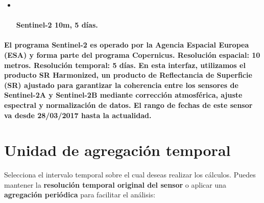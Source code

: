 \documentclass[
]{book}
\begin{document}
\begin{itemize}
\item ~
  \subsubsection{\texorpdfstring{\textbf{Sentinel-2 10m, 5 días}.}{Sentinel-2 10m, 5 días.}}\label{sentinel-2-10m-5-duxedas.}
\end{itemize}

\subsubsection{\texorpdfstring{El programa \textbf{Sentinel-2} es operado por la Agencia Espacial Europea (ESA) y forma parte del programa Copernicus. \textbf{Resolución espacial:} 10 metros. \textbf{Resolución temporal:} 5 días. En esta interfaz, utilizamos el producto SR Harmonized, un producto de Reflectancia de Superficie (SR) ajustado para garantizar la coherencia entre los sensores de Sentinel-2A y Sentinel-2B mediante corrección atmosférica, ajuste espectral y normalización de datos. El \textbf{rango de fechas} de este sensor va desde \textbf{28/03/2017 hasta la actualidad.}}{El programa Sentinel-2 es operado por la Agencia Espacial Europea (ESA) y forma parte del programa Copernicus. Resolución espacial: 10 metros. Resolución temporal: 5 días. En esta interfaz, utilizamos el producto SR Harmonized, un producto de Reflectancia de Superficie (SR) ajustado para garantizar la coherencia entre los sensores de Sentinel-2A y Sentinel-2B mediante corrección atmosférica, ajuste espectral y normalización de datos. El rango de fechas de este sensor va desde 28/03/2017 hasta la actualidad.}}\label{el-programa-sentinel-2-es-operado-por-la-agencia-espacial-europea-esa-y-forma-parte-del-programa-copernicus.-resoluciuxf3n-espacial-10-metros.-resoluciuxf3n-temporal-5-duxedas.-en-esta-interfaz-utilizamos-el-producto-sr-harmonized-un-producto-de-reflectancia-de-superficie-sr-ajustado-para-garantizar-la-coherencia-entre-los-sensores-de-sentinel-2a-y-sentinel-2b-mediante-correcciuxf3n-atmosfuxe9rica-ajuste-espectral-y-normalizaciuxf3n-de-datos.-el-rango-de-fechas-de-este-sensor-va-desde-28032017-hasta-la-actualidad.}

\chapter{Unidad de agregación temporal}\label{agregacion-temporal}

Selecciona el intervalo temporal sobre el cual deseas realizar los cálculos. Puedes mantener la \textbf{resolución temporal original del sensor} o aplicar una \textbf{agregación periódica} para facilitar el análisis:
\end{document}
